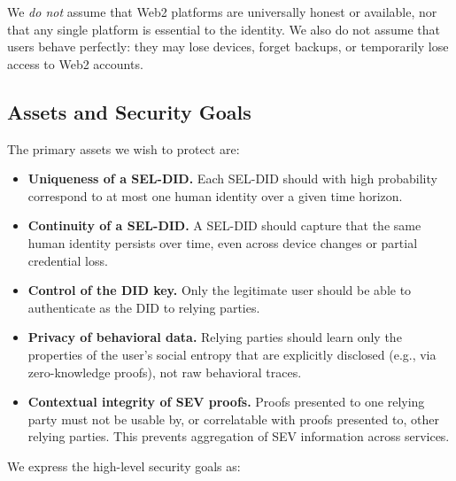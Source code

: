 \documentclass[11pt]{article}
\begin{document}
We \emph{do not} assume that Web2 platforms are universally honest or available, nor that any single platform is essential to the identity. We also do not assume that users behave perfectly: they may lose devices, forget backups, or temporarily lose access to Web2 accounts.

\subsection{Assets and Security Goals}

The primary assets we wish to protect are:

\begin{itemize}
  \item \textbf{Uniqueness of a SEL-DID.} Each SEL-DID should with high probability correspond to at most one human identity over a given time horizon.
  \item \textbf{Continuity of a SEL-DID.} A SEL-DID should capture that the same human identity persists over time, even across device changes or partial credential loss.
  \item \textbf{Control of the DID key.} Only the legitimate user should be able to authenticate as the DID to relying parties.
  \item \textbf{Privacy of behavioral data.} Relying parties should learn only the properties of the user's social entropy that are explicitly disclosed (e.g., via zero-knowledge proofs), not raw behavioral traces.
  \item \textbf{Contextual integrity of SEV proofs.} Proofs presented to one relying party must not be usable by, or correlatable with proofs presented to, other relying parties. This prevents aggregation of SEV information across services.
\end{itemize}

We express the high-level security goals as:
\end{document}

